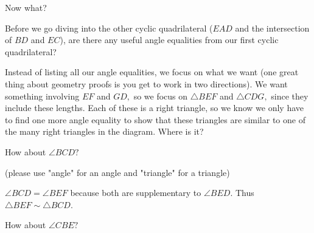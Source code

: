 Now what?


Before we go diving into the other cyclic quadrilateral ($EAD$ and the intersection of $BD$ and $EC$), are there any useful angle equalities from our first cyclic quadrilateral?

Instead of listing all our angle equalities, we focus on what we want (one great thing about geometry proofs is you get to work in two directions). We want something involving $EF$ and $GD,$ so we focus on $\triangle BEF$ and $\triangle CDG,$ since they include these lengths. Each of these is a right triangle, so we know we only have to find one more angle equality to show that these triangles are similar to one of the many right triangles in the diagram. Where is it?

How about $\angle BCD?$

(please use "angle" for an angle and "triangle" for a triangle)







$\angle BCD = \angle BEF$ because both are supplementary to $\angle BED.$ Thus $\triangle BEF \sim \triangle BCD$.

How about $\angle CBE?$



